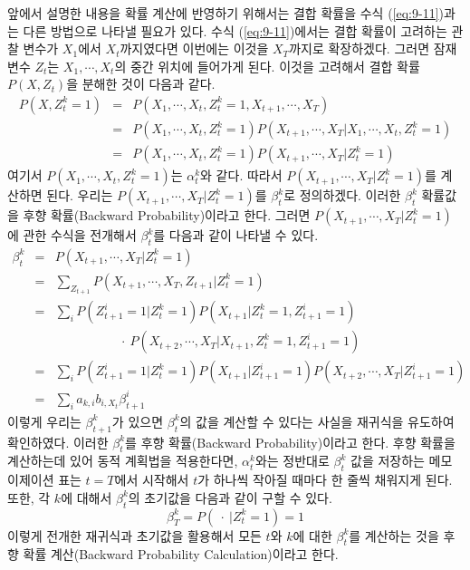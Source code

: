 \documentclass[a4paper]{oblivoir}
\begin{document}
앞에서 설명한 내용을 확률 계산에 반영하기 위해서는 결합 확률을 수식 (\ref{eq:9-11})과는 다른 방법으로 나타낼 필요가 있다. 수식 (\ref{eq:9-11})에서는 결합 확률이 고려하는 관찰 변수가 $X_{1}$에서 $X_{t}$까지였다면 이번에는 이것을 $X_{T}$까지로 확장하겠다. 그러면 잠재 변수 $Z_{t}$는 $X_{1},\cdots,X_{t}$의 중간 위치에 들어가게 된다. 이것을 고려해서 결합 확률 $P(X,Z_{t})$을 분해한 것이 다음과 같다. 
\begin{eqnarray}
P(X,Z_{t}^{k}=1) & = & P(X_{1},\cdots,X_{t},Z_{t}^{k}=1,X_{t+1},\cdots,X_{T}) \nonumber \\
& = &  P(X_{1},\cdots,X_{t},Z_{t}^{k}=1)P(X_{t+1},\cdots,X_{T}|X_{1},\cdots,X_{t},Z_{t}^{k}=1) \nonumber \\
& = & P(X_{1},\cdots,X_{t},Z_{t}^{k}=1)P(X_{t+1},\cdots,X_{T}|Z_{t}^{k}=1) \label{eq:9-16}
\end{eqnarray}
여기서 $P(X_{1},\cdots,X_{t},Z_{t}^{k}=1)$는 $\alpha_{t}^{k}$와 같다. 따라서 $P(X_{t+1},\cdots,X_{T}|Z_{t}^{k}=1)$를 계산하면 된다. 우리는 $P(X_{t+1},\cdots,X_{T}|Z_{t}^{k}=1)$를 $\beta_{t}^{k}$로 정의하겠다. 이러한 $\beta_{t}^{k}$ 확률값을 후향 확률(Backward Probability)이라고 한다. 그러면 $P(X_{t+1},\cdots,X_{T}|Z_{t}^{k}=1)$에 관한 수식을 전개해서 $\beta_{t}^{k}$를 다음과 같이 나타낼 수 있다.
\begin{eqnarray}
\beta_{t}^{k} & = & P(X_{t+1},\cdots,X_{T}|Z_{t}^{k}=1) \nonumber \\
& = & \sum_{Z_{t+1}} P(X_{t+1},\cdots,X_{T}, Z_{t+1}|Z_{t}^{k}=1) \nonumber \\ 
& = & \sum_{i} P(Z_{t+1}^{i}=1|Z_{t}^{k}=1) P(X_{t+1}|Z_{t}^{k}=1, Z_{t+1}^{i}=1)  \nonumber \\
& & \ \ \ \ \ \ \ \ \ \ \ \ \ \ \ \ \ \ \ \ \ \ \ \cdot \ P(X_{t+2},\cdots,X_{T}|X_{t+1}, Z_{t}^{k}=1, Z_{t+1}^{i}=1) \nonumber \\
& = & \sum_{i} P(Z_{t+1}^{i}=1|Z_{t}^{k}=1) P(X_{t+1}|Z_{t+1}^{i}=1) P(X_{t+2},\cdots,X_{T}| Z_{t+1}^{i}=1) \nonumber \\
& = & \sum_{i} a_{k,i} b_{i,X_{t}} \beta_{t+1}^{i} \label{eq:9-17}
\end{eqnarray}
이렇게 우리는 $\beta_{t+1}^{k}$가 있으면 $\beta_{t}^{k}$의 값을 계산할 수 있다는 사실을 재귀식을 유도하여 확인하였다. 이러한 $\beta_{t}^{k}$를 후향 확률(Backward Probability)이라고 한다. 후향 확률을 계산하는데 있어 동적 계획법을 적용한다면, $\alpha_{t}^{k}$와는 정반대로 $\beta_{t}^{k}$ 값을 저장하는 메모이제이션 표는 $t=T$에서 시작해서 $t$가 하나씩 작아질 때마다 한 줄씩 채워지게 된다. 또한, 각 $k$에 대해서 $\beta_{t}^{k}$의 초기값을 다음과 같이 구할 수 있다. 
\begin{equation}
\beta_{T}^{k} = P(\ \cdot \ |Z_{t}^{k}=1) = 1
\label{eq:9-18}
\end{equation} 
이렇게 전개한 재귀식과 초기값을 활용해서 모든 $t$와 $k$에 대한 $\beta_{t}^{k}$를 계산하는 것을 후향 확률 계산(Backward Probability Calculation)이라고 한다. \\
\end{document}
